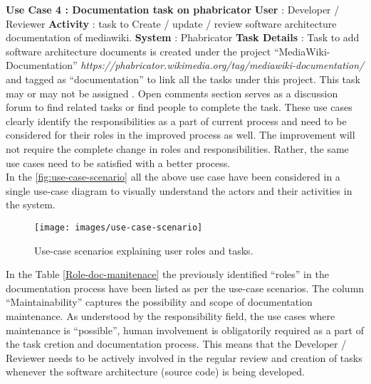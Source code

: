 \newline \newline
\indent \textbf{Use Case 4 : Documentation task on phabricator}
\newline \textbf{User} : Developer / Reviewer
\newline \textbf{Activity} : task to Create / update / review software architecture documentation of mediawiki.
\newline \textbf{System} : Phabricator
\newline \textbf{Task Details} : Task to add software architecture documents is created under the project \enquote{MediaWiki-Documentation} \emph{https://phabricator.wikimedia.org/tag/mediawiki-documentation/} and tagged as \enquote{documentation} to link all the tasks under this project. This task may or may not be assigned . Open comments section serves as a discussion forum to find related tasks or find people to complete the task.
\newline
\newline
\indent These use cases clearly identify the responsibilities as a part of current process and need to be considered for their roles in the improved process as well. The improvement will not require the complete change in roles and responsibilities. Rather, the same use cases need to be satisfied with a better process.
\newline
\\\indent In the \autoref{fig:use-case-scenario} all the above use case have been considered in a single use-case diagram to visually understand the actors and their activities in the system.

\begin{figure}[H]
  \centering
  \texttt{[image: images/use-case-scenario]}
  \caption[Use-case scenarios explaining user roles and tasks]{Use-case scenarios explaining user roles and tasks.}\label{fig:use-case-scenario}
\end{figure}

In the Table \autoref{Role-doc-manitenace} the previously identified \enquote{roles} in the documentation process have been listed as per the use-case scenarios. The column \enquote{Maintainability} captures the possibility and scope of documentation maintenance. As understood by the responsibility field, the use cases where maintenance is \enquote{possible}, human involvement is obligatorily required as a part of the task cretion and documentation process. This means that the Developer / Reviewer needs to be actively involved in the regular review and creation of tasks whenever the software architecture (source code) is being developed.

